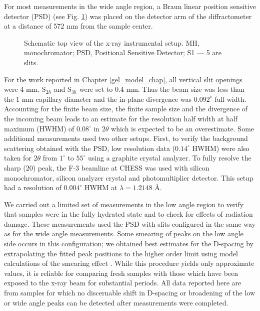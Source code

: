 For most measurements in the wide angle region, a Braun linear
position sensitive detector (PSD) (see Fig. \ref{matmet_xray}) was placed 
on the detector arm of the diffractometer at a distance of 572 mm from 
the sample center. 

\begin{figure}[h]
\label{matmet_xray}
\centerline{}
\caption{Schematic top view of the x-ray instrumental setup. MH, monochromator;
PSD, Positional Sensitive Detector; S1 --- 5 are slits.}
\end{figure}

For the work reported in Chapter \ref{gel_model_chap},
all vertical slit openings were 4 mm. $\mbox{S}_{2h}$ and $\mbox{S}_{3h}$ 
were set to 0.4 mm.  Thus the beam size was less than the 1 mm
capillary diameter and the in-plane divergence was $0.092^{\circ}$ full width.
Accounting for the finite beam size, the finite sample size and the
divergence of the incoming beam leads to an estimate for the resolution
half width at half maximum (HWHM) of $0.08^{\circ}$ in 2$\theta$ which
is expected to be an overestimate. 
Some additional measurements used two other setups. First,
to verify the background scattering obtained with the PSD,
low resolution data ($0.14^{\circ}$ HWHM) were
also taken for 2$\theta$ from $1^{\circ}$ to $55^{\circ}$ using a 
graphite crystal analyzer. To fully resolve the sharp (20) peak, 
the F-3 beamline at CHESS was used with silicon monochromator, silicon 
analyzer crystal and photomultiplier detector. This setup had a resolution 
of $0.004^{\circ}$ HWHM at $\lambda = 1.2148$ \AA.

We carried out a limited set of measurements in the low angle region
to verify that samples were in the fully hydrated state and to check
for effects of radiation damage.  These measurements used the PSD
with slits configured in the same way as for the wide angle
measurements.  Some smearing of peaks on the low angle side occurs in
this configuration; we obtained best estimates for the D-spacing by
extrapolating the fitted peak positions to the higher order limit using
model calculations of the smearing effect \cite{STN92}. While this procedure
yields only approximate values, it is reliable for comparing fresh
samples with those which have been exposed to the x-ray beam for
substantial periods.  All data reported here are from samples for
which no discernable shift in D-spacing or broadening of the low or wide
angle peaks can be detected after measurements were completed. 

